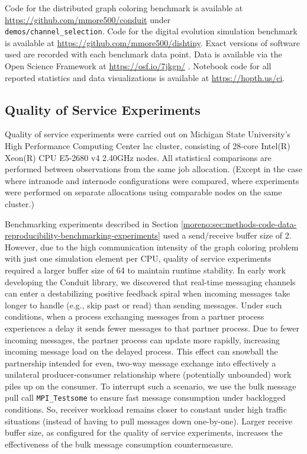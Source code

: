 Code for the distributed graph coloring benchmark is available at \url{https://github.com/mmore500/conduit} under \\ \texttt{demos/channel\_selection}.
Code for the digital evolution simulation benchmark is available at \url{https://github.com/mmore500/dishtiny}.
Exact versions of software used are recorded with each benchmark data point.
Data is available via the Open Science Framework at \url{https://osf.io/7jkgp/} \cite{foster2017open}.
Notebook code for all reported statistics and data visualizations is available at \url{https://hopth.us/ci}.

\subsection{Quality of Service Experiments}

Quality of service experiments were carried out on Michigan State University's High Performance Computing Center lac cluster, consisting of 28-core Intel(R) Xeon(R) CPU E5-2680 v4 \@ 2.40GHz nodes.
All statistical comparisons are performed between observations from the same job allocation.
(Except in the case where intranode and internode configurations were compared, where experiments were performed on separate allocations using comparable nodes on the same cluster.)

Benchmarking experiments described in Section \ref{moreno:sec:methods-code-data-reproducibility-benchmarking-experiments} used a send/receive buffer size of 2.
However, due to the high communication intensity of the graph coloring problem with just one simulation element per CPU, quality of service experiments required a larger buffer size of 64 to maintain runtime stability.
In early work developing the Conduit library, we discovered that real-time messaging channels can enter a destabilizing positive feedback spiral when incoming messages take longer to handle (e.g., skip past or read) than sending messages.
Under such conditions, when a process exchanging messages from a partner process experiences a delay it sends fewer messages to that partner process.
Due to fewer incoming messages, the partner process can update more rapidly, increasing incoming message load on the delayed process.
This effect can snowball the partnership intended for even, two-way message exchange into effectively a unilateral producer-consumer relationship where (potentially unbounded) work piles up on the consumer.
To interrupt such a scenario, we use the bulk message pull call \verb|MPI_Testsome| to ensure fast message consumption under backlogged conditions.
So, receiver workload remains closer to constant under high traffic situations (instead of having to pull messages down one-by-one).
Larger receive buffer size, as configured for the quality of service experiments, increases the effectiveness of the bulk message consumption countermeasure.

